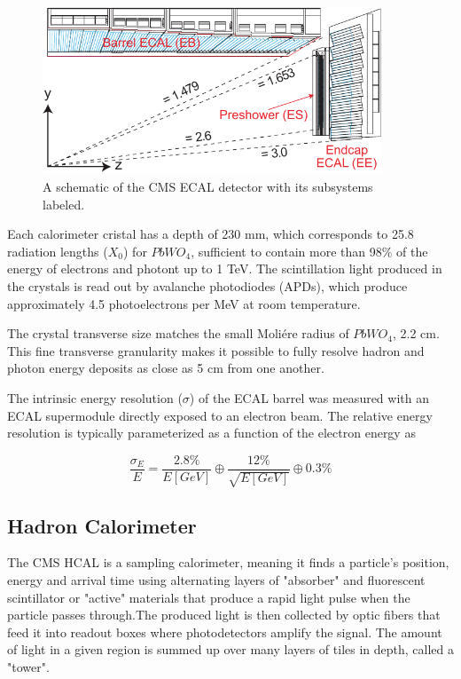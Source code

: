     \begin{figure}[H]
 	\centering
 	\includegraphics[width=0.9\textwidth]{figures/ECAL_transverse_Section.pdf}
 	\singlespace
 	\caption{A schematic of the CMS ECAL detector with its subsystems labeled.}
 	\label{fig:cmsecal}
	 \end{figure}

Each calorimeter cristal has a depth of 230 mm, which corresponds to 25.8 radiation lengths ($X_{0}$) for $PbWO_{4}$, sufficient to contain more than 98$\%$ of the energy of electrons and photont up to 1 TeV. The scintillation light produced in the crystals is read out by avalanche photodiodes (APDs), which produce approximately 4.5 photoelectrons per MeV at room temperature. 

The crystal transverse size matches the small Moliére radius of $PbWO_{4}$, 2.2 cm. This fine transverse granularity makes it possible to fully resolve hadron and photon energy deposits as close as 5 cm from one another.

The intrinsic energy resolution ($\sigma$) of the ECAL barrel was measured with an ECAL supermodule directly exposed to an electron beam\cite{Ingram_2007}. The relative energy resolution is typically parameterized as a function of the electron energy as

\begin{equation}
\frac{\sigma_{E}}{E} = \frac{2.8\%}{E[GeV]} \oplus \frac{12\%}{\sqrt{E[GeV]}} \oplus 0.3\%
\end{equation}

 \subsection{Hadron Calorimeter}

 The CMS HCAL\cite{CMS:1997tfa} is a sampling calorimeter, meaning it finds a particle's position, energy and arrival time using alternating layers of "absorber" and fluorescent scintillator or "active" materials that produce a rapid light pulse when the particle passes through.The produced light is then collected by optic fibers that feed it into readout boxes where photodetectors amplify the signal. The amount of light in a given region is summed up over many layers of tiles in depth, called a "tower". 

